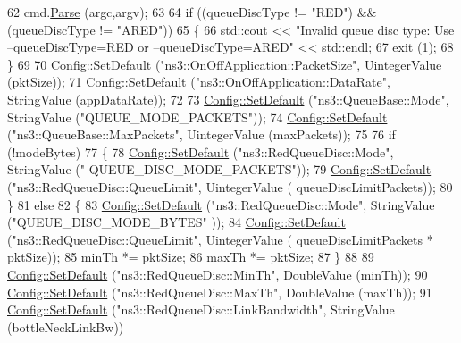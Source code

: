 \begin{DoxyCode}
62   cmd.\hyperlink{classns3_1_1CommandLine_a5c10b85b3207e5ecb48d907966923156}{Parse} (argc,argv);
63 
64   \textcolor{keywordflow}{if} ((queueDiscType != \textcolor{stringliteral}{"RED"}) && (queueDiscType != \textcolor{stringliteral}{"ARED"}))
65     \{
66       std::cout << \textcolor{stringliteral}{"Invalid queue disc type: Use --queueDiscType=RED or --queueDiscType=ARED"} << std::endl;
67       exit (1);
68     \}
69 
70   \hyperlink{group__config_ga2e7882df849d8ba4aaad31c934c40c06}{Config::SetDefault} (\textcolor{stringliteral}{"ns3::OnOffApplication::PacketSize"}, UintegerValue (pktSize));
71   \hyperlink{group__config_ga2e7882df849d8ba4aaad31c934c40c06}{Config::SetDefault} (\textcolor{stringliteral}{"ns3::OnOffApplication::DataRate"}, StringValue (appDataRate));
72 
73   \hyperlink{group__config_ga2e7882df849d8ba4aaad31c934c40c06}{Config::SetDefault} (\textcolor{stringliteral}{"ns3::QueueBase::Mode"}, StringValue (\textcolor{stringliteral}{"QUEUE\_MODE\_PACKETS"}));
74   \hyperlink{group__config_ga2e7882df849d8ba4aaad31c934c40c06}{Config::SetDefault} (\textcolor{stringliteral}{"ns3::QueueBase::MaxPackets"}, UintegerValue (maxPackets));
75 
76   \textcolor{keywordflow}{if} (!modeBytes)
77     \{
78       \hyperlink{group__config_ga2e7882df849d8ba4aaad31c934c40c06}{Config::SetDefault} (\textcolor{stringliteral}{"ns3::RedQueueDisc::Mode"}, StringValue (\textcolor{stringliteral}{"
      QUEUE\_DISC\_MODE\_PACKETS"}));
79       \hyperlink{group__config_ga2e7882df849d8ba4aaad31c934c40c06}{Config::SetDefault} (\textcolor{stringliteral}{"ns3::RedQueueDisc::QueueLimit"}, UintegerValue (
      queueDiscLimitPackets));
80     \}
81   \textcolor{keywordflow}{else}
82     \{
83       \hyperlink{group__config_ga2e7882df849d8ba4aaad31c934c40c06}{Config::SetDefault} (\textcolor{stringliteral}{"ns3::RedQueueDisc::Mode"}, StringValue (\textcolor{stringliteral}{"QUEUE\_DISC\_MODE\_BYTES"}
      ));
84       \hyperlink{group__config_ga2e7882df849d8ba4aaad31c934c40c06}{Config::SetDefault} (\textcolor{stringliteral}{"ns3::RedQueueDisc::QueueLimit"}, UintegerValue (
      queueDiscLimitPackets * pktSize));
85       minTh *= pktSize;
86       maxTh *= pktSize;
87     \}
88 
89   \hyperlink{group__config_ga2e7882df849d8ba4aaad31c934c40c06}{Config::SetDefault} (\textcolor{stringliteral}{"ns3::RedQueueDisc::MinTh"}, DoubleValue (minTh));
90   \hyperlink{group__config_ga2e7882df849d8ba4aaad31c934c40c06}{Config::SetDefault} (\textcolor{stringliteral}{"ns3::RedQueueDisc::MaxTh"}, DoubleValue (maxTh));
91   \hyperlink{group__config_ga2e7882df849d8ba4aaad31c934c40c06}{Config::SetDefault} (\textcolor{stringliteral}{"ns3::RedQueueDisc::LinkBandwidth"}, StringValue (bottleNeckLinkBw))

\end{DoxyCode}
